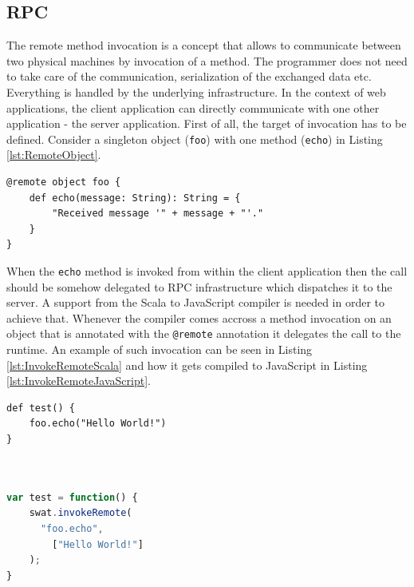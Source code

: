 \documentclass[12pt,a4paper]{report}
\begin{document}
\subsection{RPC}

The remote method invocation is a concept that allows to communicate between two physical machines by invocation of a method. The programmer does not need to take care of the communication, serialization of the exchanged data etc. Everything is handled by the underlying infrastructure. In the context of web applications, the client application can directly communicate with one other application - the server application. First of all, the target of invocation has to be defined. Consider a singleton object (\texttt{foo}) with one method (\texttt{echo}) in Listing \ref{lst:RemoteObject}.

\begin{minipage}{\linewidth}
\begin{lstlisting}[caption={A remote object.},label={lst:RemoteObject}]
@remote object foo {
	def echo(message: String): String = {
		"Received message '" + message + "'."
	}
}
\end{lstlisting}
\end{minipage}

When the \texttt{echo} method is invoked from within the client application then the call should be somehow delegated to RPC infrastructure which dispatches it to the server. A support from the Scala to JavaScript compiler is needed in order to achieve that. Whenever the compiler comes accross a method invocation on an object that is annotated with the \texttt{@remote} annotation it delegates the call to the runtime. An example of such invocation can be seen in Listing \ref{lst:InvokeRemoteScala} and how it gets compiled to JavaScript in Listing \ref{lst:InvokeRemoteJavaScript}.

\begin{center}
\begin{minipage}{.48\textwidth}
  \begin{lstlisting}[caption={Remote method invocation in Scala.},label={lst:InvokeRemoteScala},showlines=true]
def test() {
	foo.echo("Hello World!")
}



  \end{lstlisting}
\end{minipage}
\hfill
\begin{minipage}{.48\textwidth}
  \begin{lstlisting}[language=JavaScript,caption={Remote method invocation in JavaScript.},label={lst:InvokeRemoteJavaScript}]
var test = function() {
	swat.invokeRemote(
	  "foo.echo", 
		["Hello World!"]
	);
}
  \end{lstlisting}
\end{minipage}
\end{center}
\end{document}

